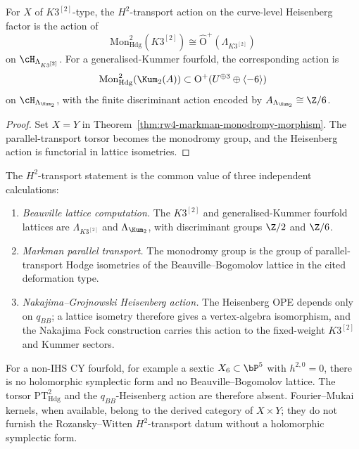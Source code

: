 \begin{corollary}
\label{cor:rw4-endomorphism-algebra}
For \(X\) of \(K3^{[2]}\)-type, the \(H^2\)-transport action on the
curve-level Heisenberg factor is the action of
\[
 \mathrm{Mon}^2_{\mathrm{Hdg}}(K3^{[2]}) \cong
 \widehat{\mathrm{O}}^+(\Lambda_{K3^{[2]}})
\]
on \(\cH_{\Lambda_{K3^{[2]}}}\). For a generalised-Kummer fourfold,
the corresponding action is
\[
 \mathrm{Mon}^2_{\mathrm{Hdg}}(\Kum_2(A))
 \subset
 \mathrm{O}^+(U^{\oplus 3}\oplus\langle -6\rangle)
\]
on \(\cH_{\Lambda_{\Kum_2}}\), with the finite discriminant action
encoded by \(A_{\Lambda_{\Kum_2}}\cong\Z/6\).
\end{corollary}

\begin{proof}
Set \(X=Y\) in Theorem~\ref{thm:rw4-markman-monodromy-morphism}. The
parallel-transport torsor becomes the monodromy group, and the
Heisenberg action is functorial in lattice isometries.
\end{proof}

\begin{remark}
\label{rem:rw4-markman-three-paths}
The \(H^2\)-transport statement is the common value of three
independent calculations:
\begin{enumerate}[label=\textup{(V\arabic*)}]
\item \emph{Beauville lattice computation.} The \(K3^{[2]}\) and
generalised-Kummer fourfold lattices are
\(\Lambda_{K3^{[2]}}\) and \(\Lambda_{\Kum_2}\), with discriminant
groups \(\Z/2\) and \(\Z/6\).
\item \emph{Markman parallel transport.} The monodromy group is the
group of parallel-transport Hodge isometries of the
Beauville--Bogomolov lattice in the cited deformation type.
\item \emph{Nakajima--Grojnowski Heisenberg action.} The Heisenberg
OPE depends only on \(q_{BB}\); a lattice isometry therefore gives a
vertex-algebra isomorphism, and the Nakajima Fock construction carries
this action to the fixed-weight \(K3^{[2]}\) and Kummer sectors.
\end{enumerate}
\end{remark}

\begin{remark}
\label{rem:rw4-morphism-beyond-failure}
For a non-IHS CY fourfold, for example a sextic
\(X_6\subset\bP^5\) with \(h^{2,0}=0\), there is no holomorphic
symplectic form and no Beauville--Bogomolov lattice. The torsor
\(\mathrm{PT}^2_{\mathrm{Hdg}}\) and the \(q_{BB}\)-Heisenberg action
are therefore absent. Fourier--Mukai kernels, when available, belong
to the derived category of \(X\times Y\); they do not furnish the
Rozansky--Witten \(H^2\)-transport datum without a holomorphic
symplectic form.
\end{remark}

